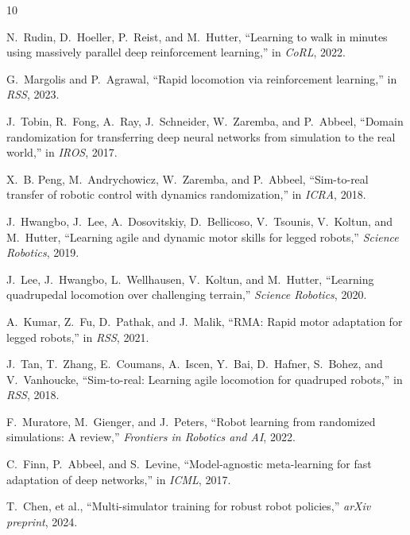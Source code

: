 \documentclass[conference]{IEEEtran}
\begin{document}

\begin{thebibliography}{10}

N.~Rudin, D.~Hoeller, P.~Reist, and M.~Hutter, ``Learning to walk in minutes using massively parallel deep reinforcement learning,'' in \textit{CoRL}, 2022.

G.~Margolis and P.~Agrawal, ``Rapid locomotion via reinforcement learning,'' in \textit{RSS}, 2023.

J.~Tobin, R.~Fong, A.~Ray, J.~Schneider, W.~Zaremba, and P.~Abbeel, ``Domain randomization for transferring deep neural networks from simulation to the real world,'' in \textit{IROS}, 2017.

X.~B. Peng, M.~Andrychowicz, W.~Zaremba, and P.~Abbeel, ``Sim-to-real transfer of robotic control with dynamics randomization,'' in \textit{ICRA}, 2018.

J.~Hwangbo, J.~Lee, A.~Dosovitskiy, D.~Bellicoso, V.~Tsounis, V.~Koltun, and M.~Hutter, ``Learning agile and dynamic motor skills for legged robots,'' \textit{Science Robotics}, 2019.

J.~Lee, J.~Hwangbo, L.~Wellhausen, V.~Koltun, and M.~Hutter, ``Learning quadrupedal locomotion over challenging terrain,'' \textit{Science Robotics}, 2020.

A.~Kumar, Z.~Fu, D.~Pathak, and J.~Malik, ``RMA: Rapid motor adaptation for legged robots,'' in \textit{RSS}, 2021.

J.~Tan, T.~Zhang, E.~Coumans, A.~Iscen, Y.~Bai, D.~Hafner, S.~Bohez, and V.~Vanhoucke, ``Sim-to-real: Learning agile locomotion for quadruped robots,'' in \textit{RSS}, 2018.

F.~Muratore, M.~Gienger, and J.~Peters, ``Robot learning from randomized simulations: A review,'' \textit{Frontiers in Robotics and AI}, 2022.

C.~Finn, P.~Abbeel, and S.~Levine, ``Model-agnostic meta-learning for fast adaptation of deep networks,'' in \textit{ICML}, 2017.

T.~Chen, et al., ``Multi-simulator training for robust robot policies,'' \textit{arXiv preprint}, 2024.

\end{thebibliography}
\end{document}
